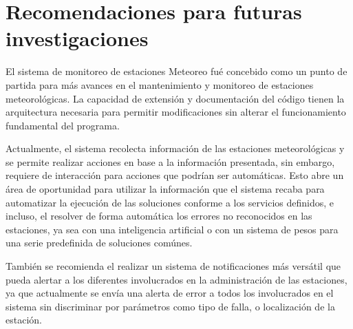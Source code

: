 
\section{Recomendaciones para futuras investigaciones}

El sistema de monitoreo de estaciones Meteoreo fué concebido como un punto de partida para más avances en el mantenimiento y monitoreo de estaciones meteorológicas. La capacidad de extensión y documentación del código tienen la arquitectura necesaria para permitir modificaciones sin alterar el funcionamiento fundamental del programa.

Actualmente, el sistema recolecta información de las estaciones meteorológicas y se permite realizar acciones en base a la información presentada, sin embargo, requiere de interacción para acciones que podrían ser automáticas. Esto abre un área de oportunidad para utilizar la información que el sistema recaba para automatizar la ejecución de las soluciones conforme a los servicios definidos, e incluso, el resolver de forma automática los errores no reconocidos en las estaciones, ya sea con una inteligencia artificial o con un sistema de pesos para una serie predefinida de soluciones comúnes.

También se recomienda el realizar un sistema de notificaciones más versátil que pueda alertar a los diferentes involucrados en la administración de las estaciones, ya que actualmente se envía una alerta de error a todos los involucrados en el sistema sin discriminar por parámetros como tipo de falla, o localización de la estación.




